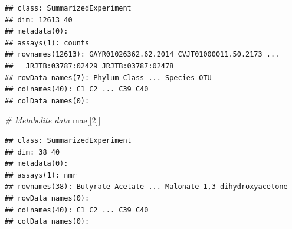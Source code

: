 \documentclass[
]{book}
\newenvironment{Shaded}{\begin{snugshade}}{\end{snugshade}}
\newcommand{\AttributeTok}[1]{\textcolor[rgb]{0.77,0.63,0.00}{#1}}
\newcommand{\CommentTok}[1]{\textcolor[rgb]{0.56,0.35,0.01}{\textit{#1}}}
\newcommand{\ControlFlowTok}[1]{\textcolor[rgb]{0.13,0.29,0.53}{\textbf{#1}}}
\newcommand{\DecValTok}[1]{\textcolor[rgb]{0.00,0.00,0.81}{#1}}
\newcommand{\FunctionTok}[1]{\textcolor[rgb]{0.00,0.00,0.00}{#1}}
\newcommand{\NormalTok}[1]{#1}
\newcommand{\OtherTok}[1]{\textcolor[rgb]{0.56,0.35,0.01}{#1}}
\newcommand{\SpecialCharTok}[1]{\textcolor[rgb]{0.00,0.00,0.00}{#1}}
\newcommand{\StringTok}[1]{\textcolor[rgb]{0.31,0.60,0.02}{#1}}
\begin{document}
\begin{Shaded}
\end{Shaded}

\begin{verbatim}
## class: SummarizedExperiment 
## dim: 12613 40 
## metadata(0):
## assays(1): counts
## rownames(12613): GAYR01026362.62.2014 CVJT01000011.50.2173 ...
##   JRJTB:03787:02429 JRJTB:03787:02478
## rowData names(7): Phylum Class ... Species OTU
## colnames(40): C1 C2 ... C39 C40
## colData names(0):
\end{verbatim}

\begin{Shaded}
\begin{Highlighting}[]
\CommentTok{\# Metabolite data}
\NormalTok{mae[[}\DecValTok{2}\NormalTok{]]}
\end{Highlighting}
\end{Shaded}

\begin{verbatim}
## class: SummarizedExperiment 
## dim: 38 40 
## metadata(0):
## assays(1): nmr
## rownames(38): Butyrate Acetate ... Malonate 1,3-dihydroxyacetone
## rowData names(0):
## colnames(40): C1 C2 ... C39 C40
## colData names(0):
\end{verbatim}
\end{document}
